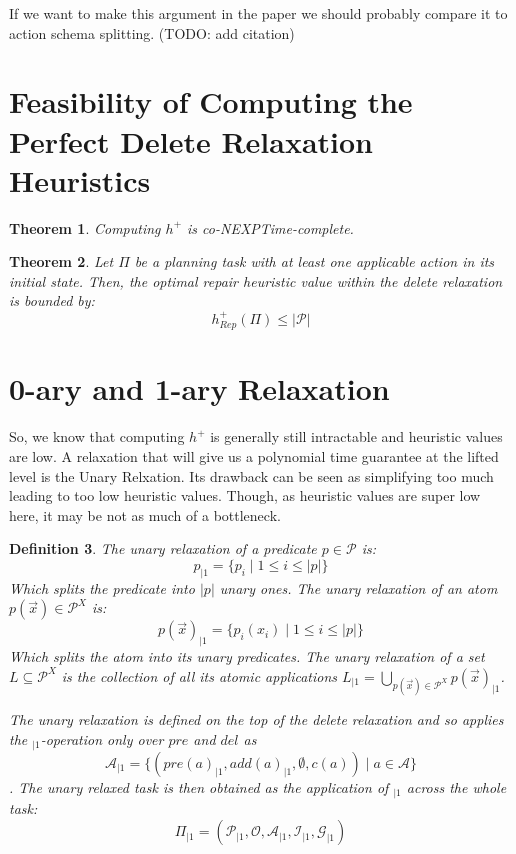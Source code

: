 \documentclass[twocolumn]{article}
\newcommand{\task}{\ensuremath{\Pi}\xspace}
\newcommand{\preds}{\ensuremath{\mathcal{P}}\xspace}
\newcommand{\acts}{\ensuremath{\mathcal{A}}\xspace}
\newcommand{\objects}{\ensuremath{\mathcal{O}}\xspace}
\newcommand{\init}{\ensuremath{\mathcal{I}}\xspace}
\newcommand{\goal}{\ensuremath{\mathcal{G}}\xspace}
\newcommand{\vars}{\ensuremath{X}\xspace}
\newcommand{\someVar}{\ensuremath{x}\xspace}
\newcommand{\atoms}{\ensuremath{\preds^{\vars}}\xspace}
\newcommand{\someAtom}{\ensuremath{p(\vec{\someVar})}\xspace}
\newcommand{\someLiftedSet}{\ensuremath{L}\xspace}
\newcommand{\somePred}{\ensuremath{p}\xspace}
\newcommand{\prename}{\ensuremath{pre}\xspace}
\newcommand{\addname}{\ensuremath{add}\xspace}
\newcommand{\delname}{\ensuremath{del}\xspace}
\newcommand{\pre}[1]{\ensuremath{\prename(#1)}\xspace}
\newcommand{\add}[1]{\ensuremath{\addname(#1)}\xspace}
\newcommand{\arity}[1]{\ensuremath{|#1|}}
\newcommand{\cost}[1]{\ensuremath{c(#1)}\xspace}
\newcommand{\someAct}{\ensuremath{a}\xspace}
\newcommand{\optimalHeuristicRel}{\ensuremath{h^{+}_{Rep}}\xspace}
\newcommand{\unary}[1]{\ensuremath{#1_{|1}}\xspace}
\newtheorem{theorem}{Theorem}
\newtheorem{definition}[theorem]{Definition}
\begin{document}
	If we want to make this argument in the paper we should probably compare it to action schema splitting.
	(TODO: add citation)
	
	\section{Feasibility of Computing the Perfect Delete Relaxation Heuristics}
	
	
	
	\begin{theorem}
		Computing $h^+$ is co-NEXPTime-complete.
	\end{theorem}
	
	
	
	\begin{theorem}
		Let \task be a planning task with at least one applicable action in its initial state.
		Then, the optimal repair heuristic value within the delete relaxation is bounded by:
		$$\optimalHeuristicRel(\task) \leq  \arity{\preds}$$
	\end{theorem}
	
	
	
	\section{0-ary and 1-ary Relaxation}
	
	So, 
	we know that computing $h^{+}$ 
	is generally still intractable and heuristic values are low.
	A relaxation that will give us a polynomial time guarantee at the lifted level is the Unary Relxation.
	Its drawback can be seen as simplifying too much leading to too low heuristic values.
	Though, as heuristic values are super low here, it may be not as much of a bottleneck.
	
	\begin{definition}
		The unary relaxation of a predicate $\somePred \in \preds$ is:
		$$
		\unary{\somePred} = \{\somePred_i \mid 1 \leq i \leq \arity{\somePred}\}
		$$
		Which splits the predicate into \arity{\somePred} unary ones.
		The unary relaxation of an atom $\someAtom \in \atoms$ is:
		$$
		\unary{\someAtom} =  \{\somePred_i(\someVar_i) \mid 1 \leq i \leq \arity{\somePred}\}
		$$
		Which splits the atom into its unary predicates.
		The unary relaxation of a set $\someLiftedSet \subseteq \atoms$ is the collection of all its atomic applications
		$
		\unary{\someLiftedSet} =  \bigcup_{\someAtom \in \atoms} \unary{\someAtom}
		$.
		
		The unary relaxation is defined on the top of the delete relaxation and so applies the {$\unary{}$}-operation only over \prename and \delname as
		$$
		\unary{\acts} = \{(\unary{\pre{\someAct}}, \unary{\add{\someAct}}, \emptyset, \cost{\someAct}) \mid \someAct \in \acts\}
		$$.
		The unary relaxed task is then obtained as the application of $\unary{}$ across the whole task:
		$$
		\unary{\task} = (\unary{\preds}, \objects, \unary{\acts}, \unary{\init}, \unary{\goal})
		$$
	\end{definition}
	
\end{document}
